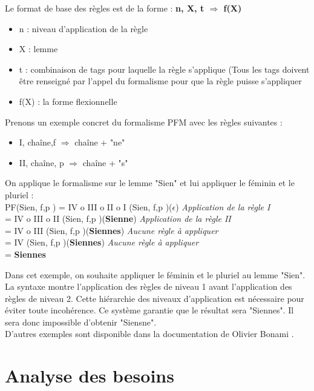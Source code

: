 \documentclass[12pt,a4paper]{article}
\begin{document}
    \smallbreak
    Le format de base des règles est de la forme : \textbf{n, X, t $\Longrightarrow$ f(X) } \\
    \begin{itemize}
        \item n : niveau d’application de la règle
        \item X : lemme
        \item t : combinaison de tags pour laquelle la règle s'applique (Tous les tags doivent être renseigné par l'appel du formalisme pour que la règle puisse s'appliquer
        \item f(X) : la forme flexionnelle
    \end{itemize}

    Prenons un exemple concret du formalisme PFM avec les règles suivantes : \\
    \begin{itemize}
        \item I, chaîne,{f} $\Longrightarrow$ chaîne + "ne"
        \item II, chaîne, {p} $\Longrightarrow$ chaîne + "s"
    \end{itemize}

    On applique le formalisme sur le lemme "Sien" et lui appliquer le féminin et le pluriel : \\
    PF(Sien, {f,p} ) = IV o III o II o I (Sien, {f,p} )(\textbf{$\epsilon$}) \textit{Application de la règle I} \\
    = IV o III o II (Sien, {f,p} )(\textbf{Sienne}) \textit{Application de la règle II} \\
    = IV o III (Sien, {f,p} )(\textbf{Siennes}) \textit{Aucune règle à appliquer} \\
    = IV (Sien, {f,p} )(\textbf{Siennes}) \textit{Aucune règle à appliquer} \\
    =\textbf{ Siennes }

    Dans cet exemple, on souhaite appliquer le féminin et le pluriel au lemme "Sien".
    La syntaxe montre l'application des règles de niveau 1 avant l'application des règles de niveau 2.
    Cette hiérarchie des niveaux d'application est nécessaire pour éviter toute incohérence. Ce système garantie que le résultat sera "Siennes". Il sera donc impossible d'obtenir "Siensne". \\
    D'autres exemples sont disponible dans la documentation de Olivier Bonami \cite{PFM}.

    \newpage
    \section{Analyse des besoins}
\end{document}

